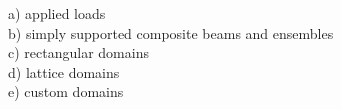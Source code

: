 \documentclass[a4paper,13pt]{article}
\begin{document}
\sffamily 


a) applied loads\\

b) simply supported composite beams and ensembles \\

c) rectangular domains\\

d) lattice domains \\

e) custom domains \\






%
%
\end{document}
